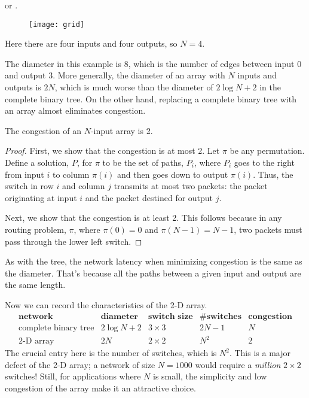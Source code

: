 \begin{staffnotes}
or .
\end{staffnotes}
\begin{figure}
\texttt{[image: grid]}
\end{figure}
Here there are four inputs and four outputs, so $N = 4$.

The diameter in this example is 8, which is the number of edges between
input 0 and output 3.  More generally, the diameter of an array with $N$
inputs and outputs is $2N$, which is much worse than the diameter of $2
\log N + 2$ in the complete binary tree.  On the other hand, replacing a
complete binary tree with an array almost eliminates congestion.

\begin{theorem}
The congestion of an $N$-input array is 2.
\end{theorem}

\begin{proof}
First, we show that the congestion is at most 2.  Let $\pi$ be any
permutation.  Define a solution, $P$, for $\pi$ to be the set of paths,
$P_i$, where $P_i$ goes to the right from input $i$ to column $\pi(i)$ and
then goes down to output $\pi(i)$.  Thus, the switch in row $i$ and column
$j$ transmits at most two packets: the packet originating at input
$i$ and the packet destined for output $j$.

Next, we show that the congestion is at least 2.  This follows because in
any routing problem, $\pi$, where $\pi(0) = 0$ and $\pi(N-1) =
N-1$, two packets must pass through the lower left switch.
\end{proof}

As with the tree, the network latency when minimizing congestion is the
same as the diameter.  That's because all the paths between a given input
and output are the same length.

Now we can record the characteristics of the 2-D array.
%
\[
\begin{array}{r|c|c|c|c}
\textbf{network} &
\textbf{diameter} &
\textbf{switch size} &
\textbf{\# switches} &
\textbf{congestion} \\ \hline
\text{complete binary tree} & 2 \log N + 2 & 3 \times 3 & 2N - 1 & N \\
\text{2-D array} & 2 N & 2 \times 2 & N^2 & 2
\end{array}
\]
%
The crucial entry here is the number of switches, which is $N^2$.
This is a major defect of the 2-D array; a network of size $N = 1000$
would require a \textit{million} $2 \times 2$ switches!  Still, for
applications where $N$ is small, the simplicity and low congestion of
the array make it an attractive choice.


